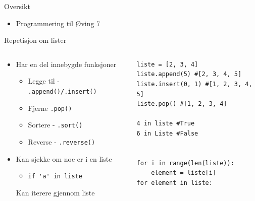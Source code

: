 \documentclass[screen, aspectratio=169]{beamer}
\begin{document}
\begin{frame}{Oversikt}
	\begin{itemize}
		\item Programmering til Øving 7
	\end{itemize}
\end{frame}

\begin{frame}[fragile]{Repetisjon om lister}
	\begin{columns}
		\begin{column}{.6\textwidth}
			\begin{itemize}
				\item Har en del innebygde funksjoner
				\begin{itemize}
					\item Legge til - \lstinline|.append()/.insert()|
					\item Fjerne \lstinline|.pop()|
					\item Sortere - \lstinline|.sort()|
					\item Reverse - \lstinline|.reverse()| 
				\end{itemize}
				\item Kan sjekke om noe er i en liste
				\begin{itemize}
				    \item \lstinline|if 'a' in liste|
				    
				\end{itemize}
				Kan iterere gjennom liste
			
			\end{itemize}
		\end{column}
		\begin{column}{.4\textwidth}
			\begin{lstlisting}
liste = [2, 3, 4]
liste.append(5) #[2, 3, 4, 5]
liste.insert(0, 1) #[1, 2, 3, 4, 5]
liste.pop() #[1, 2, 3, 4]

4 in liste #True
6 in Liste #False


for i in range(len(liste)):
    element = liste[i]
for element in liste:

			\end{lstlisting}
		\end{column}
	\end{columns}
\end{frame}
\end{document}
